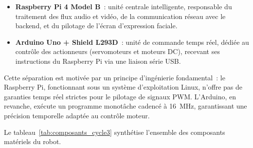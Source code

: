 \documentclass[a4paper,12pt]{report}
\begin{document}
	\begin{itemize}
		\item \textbf{Raspberry Pi 4 Model B}~: unité centrale intelligente, responsable
		du traitement des flux audio et vidéo, de la communication réseau avec le
		backend, et du pilotage de l'écran d'expression faciale.
		\item \textbf{Arduino Uno + Shield L293D}~: unité de commande temps réel,
		dédiée au contrôle des actionneurs (servomoteurs et moteurs DC), recevant
		ses instructions du Raspberry Pi via une liaison série USB.
	\end{itemize}
	
	Cette séparation est motivée par un principe d'ingénierie fondamental~: le
	Raspberry Pi, fonctionnant sous un système d'exploitation Linux, n'offre pas
	de garanties temps réel strictes pour le pilotage de signaux PWM. L'Arduino,
	en revanche, exécute un programme monotâche cadencé à 16~MHz, garantissant
	une précision temporelle adaptée au contrôle moteur.
	
	Le tableau~\ref{tab:composants_cycle3} synthétise l'ensemble des composants
	matériels du robot.
	
\end{document}
